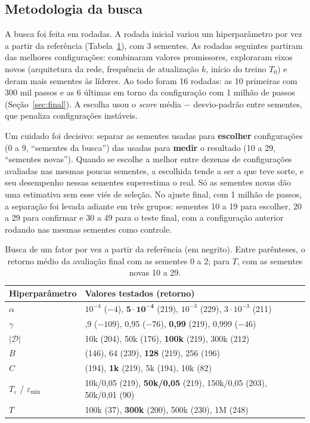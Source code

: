 \documentclass[conference]{IEEEtran}
\begin{document}
\subsection{Metodologia da busca}
A busca foi feita em rodadas. A rodada inicial variou um hiperparâmetro por vez a partir da referência (Tabela~\ref{tab:sweeps}), com 3 sementes. As rodadas seguintes partiram das melhores configurações: combinaram valores promissores, exploraram eixos novos (arquitetura da rede, frequência de atualização $k$, início do treino $T_0$) e deram mais sementes às líderes. Ao todo foram 16 rodadas: as 10 primeiras com 300 mil passos e as 6 últimas em torno da configuração com 1 milhão de passos (Seção~\ref{sec:final}). A escolha usou o \textit{score} média $-$ desvio-padrão entre sementes, que penaliza configurações instáveis.

Um cuidado foi decisivo: separar as sementes usadas para \textbf{escolher} configurações (0 a 9, ``sementes da busca'') das usadas para \textbf{medir} o resultado (10 a 29, ``sementes novas''). Quando se escolhe a melhor entre dezenas de configurações avaliadas nas mesmas poucas sementes, a escolhida tende a ser a que teve sorte, e seu desempenho nessas sementes superestima o real. Só as sementes novas dão uma estimativa sem esse viés de seleção. No ajuste final, com 1 milhão de passos, a separação foi levada adiante em três grupos: sementes 10 a 19 para escolher, 20 a 29 para confirmar e 30 a 49 para o teste final, com a configuração anterior rodando nas mesmas sementes como controle.


\begin{table}[t]
\centering
\caption{Busca de um fator por vez a partir da referência (em negrito). Entre parênteses, o retorno médio da avaliação final com as sementes 0 a 2; para $T$, com as sementes novas 10 a 29.}
\label{tab:sweeps}
\footnotesize
\setlength{\tabcolsep}{4pt}
\begin{tabularx}{\columnwidth}{@{}l>{\raggedright\arraybackslash}X@{}}
\toprule
Hiperparâmetro & Valores testados (retorno) \\
\midrule
$\alpha$ & $10^{-4}$ ($-4$), $\mathbf{5\cdot10^{-4}}$ (219), $10^{-3}$ (229), $3\cdot10^{-3}$ (211) \\
$\gamma$ & 0,9 ($-109$), 0,95 ($-76$), \textbf{0,99} (219), 0,999 ($-46$) \\
$|\mathcal{D}|$ & 10k (204), 50k (176), \textbf{100k} (219), 300k (212) \\
$B$ & 32 (146), 64 (239), \textbf{128} (219), 256 (196) \\
$C$ & 250 (194), \textbf{1k} (219), 5k (194), 10k (82) \\
$T_\varepsilon$ / $\varepsilon_{\min}$ & 10k/0,05 (219), \textbf{50k/0,05} (219), 150k/0,05 (203), 50k/0,01 (90) \\
$T$ & 100k (37), \textbf{300k} (200), 500k (230), 1M (248) \\
\bottomrule
\end{tabularx}
\end{table}
\end{document}
